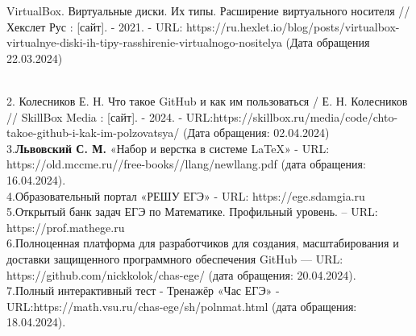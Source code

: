 \begin{thebibliography}{99}

VirtualBox. Виртуальные диски. Их типы. Расширение виртуального носителя // Хекслет Рус : [сайт]. - 2021. - URL: https://ru.hexlet.io/blog/posts/virtualbox-virtualnye-diski-ih-tipy-rasshirenie-virtualnogo-nositelya (Дата обращения 22.03.2024)

\end{thebibliography}


\\ 2. \quad Колесников Е. Н. Что такое GitHub и как им пользоваться / Е. Н. Колесников // SkillBox Media : [сайт]. - 2024. - URL:https://skillbox.ru/media/code/chto-takoe-github-i-kak-im-polzovatsya/ (Дата обращения: 02.04.2024)
\\3.\quad \textbf{Львовский С. М.} «Набор и верстка в системе LaTeX» - URL: https://old.mccme.ru//free-books//llang/newllang.pdf (дата обращения: 16.04.2024).
\\4.\quad Образовательный портал «РЕШУ ЕГЭ» - URL: https://ege.sdamgia.ru 
\\5.\quad Открытый банк задач ЕГЭ по Математике. Профильный уровень. – URL: https://prof.mathege.ru
\\6.\quad Полноценная платформа для разработчиков для создания, масштабирования и доставки защищенного программного обеспечения GitHub — URL: https://github.com/nickkolok/chas-ege/ (дата обращения: 20.04.2024).  
\\7.\quad Полный интерактивный тест - Тренажёр «Час ЕГЭ» - URL:https://math.vsu.ru/chas-ege/sh/polnmat.html (дата обращения: 18.04.2024).